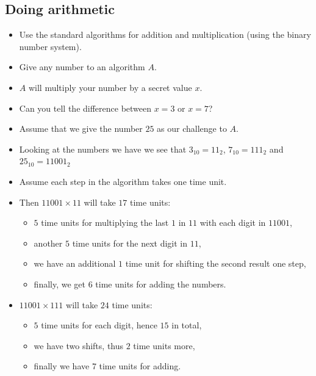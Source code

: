 \subsection{Doing arithmetic}

\begin{frame}
  \begin{example}
    \begin{itemize}
      \item Use the standard algorithms for addition and multiplication (using 
        the binary number system).
      \item Give any number to an algorithm \(A\).
      \item \(A\) will multiply your number by a secret value \(x\).
      \item Can you tell the difference between \(x = 3\) or \(x = 7\)?
    \end{itemize}
  \end{example}
\end{frame}

\begin{frame}
  \begin{itemize}
    \item Assume that we give the number \(25\) as our challenge to \(A\).
    \item Looking at the numbers we have we see that \(3_{10} = 11_2\), 
      \(7_{10} = 111_2\) and \(25_{10} = 11001_2\)

    \item Assume each step in the algorithm takes one time unit.

    \item Then \(11001\times 11\) will take \(17\) time units:
      \begin{itemize}
        \item \(5\) time units for multiplying the last \(1\) in \(11\) with 
          each digit in \(11001\),

        \item another \(5\) time units for the next digit in \(11\),

        \item we have an additional \(1\) time unit for shifting the second 
          result one step,

        \item finally, we get \(6\) time units for adding the numbers.
      \end{itemize}

    \item \(11001\times 111\) will take \(24\) time units:
      \begin{itemize}
        \item \(5\) time units for each digit, hence \(15\) in total,

        \item we have two shifts, thus \(2\) time units more,

        \item finally we have \(7\) time units for adding.
      \end{itemize}
  \end{itemize}
\end{frame}

